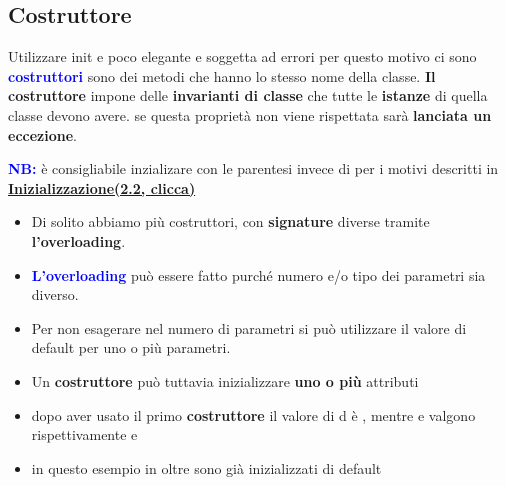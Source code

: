 \subsection{Costruttore}
Utilizzare init e poco elegante e soggetta ad errori per questo motivo ci sono \textbf{\textcolor{blue}{costruttori}} sono dei metodi che hanno lo stesso nome della classe. \textbf{Il costruttore} impone delle \textbf{invarianti di classe} che tutte le \textbf{istanze} di quella classe devono avere. se questa proprietà non viene rispettata sarà \textbf{lanciata un eccezione}.
\begin{tcolorbox}[width=12cm, boxsep=10pt]
   
    \textbf{\textcolor{blue}{NB:}} è consigliabile inzializare con le parentesi \textbf{\textcolor{blue}{\code{\{\}}}} invece di \textbf{\textcolor{blue}{\code{()}}} per i motivi descritti in \textbf{\hyperlink{init}{Inizializzazione(2.2, clicca)}} 
\end{tcolorbox}
\begin{itemize}
    \item Di solito abbiamo più costruttori, con \textbf{signature} diverse tramite \textbf{l'overloading}.
    \item  \textbf{\textcolor{blue}{L’overloading}} può essere fatto purché numero e/o tipo dei
    parametri sia diverso.
    \item  Per non esagerare nel numero di parametri si può utilizzare il valore di default per uno o più parametri.
\end{itemize}
    \begin{tcolorbox}[width=12cm, boxsep=10pt]
         
        \begin{itemize}
            \item Un \textbf{costruttore} può tuttavia inizializzare \textbf{uno o più} attributi
            \item dopo aver usato il primo \textbf{costruttore} il valore di d è , mentre  e  valgono rispettivamente  e 
            \item in questo esempio in oltre  sono già inizializzati di default
        \end{itemize}
        
    \end{tcolorbox}
    
\newpage
